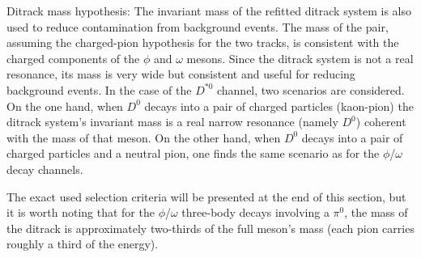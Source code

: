 \begin{myitemlist}
    \item[Ditrack mass hypothesis:] The invariant mass of the refitted ditrack system is also used to reduce contamination from background events. The mass of the pair, assuming the charged-pion hypothesis for the two tracks, is consistent with the charged components of the $\phi$ and $\omega$ mesons. Since the ditrack system is not a real resonance, its mass is very wide but consistent and useful for reducing background events. In the case of the $D^{*0}$ channel, two scenarios are considered. On the one hand, when $D^{0}$ decays into a pair of charged particles (kaon-pion) the ditrack system's invariant mass is a real narrow resonance (namely $D^{0}$) coherent with the mass of that meson. On the other hand, when $D^{0}$ decays into a pair of charged particles and a neutral pion, one finds the same scenario as for the $\phi$/$\omega$ decay channels.
    
    The exact used selection criteria will be presented at the end of this section, but it is worth noting that for the $\phi$/$\omega$ three-body decays involving a $\pi^0$, the mass of the ditrack is approximately two-thirds of the full meson's mass (each pion carries roughly a third of the energy).


\end{myitemlist}
